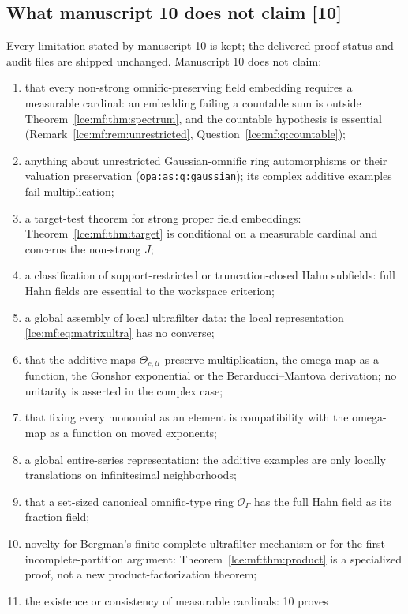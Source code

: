 \documentclass[11pt,letterpaper]{article}
\numberwithin{equation}{section}
\theoremstyle{definition}
\theoremstyle{remark}
\newcommand{\thref}[1]{Theorem~\ref{#1}}
\newcommand{\src}[1]{\textup{\textsf{\small[#1]}}}%
\newcommand{\lbl}[1]{\nolinkurl{#1}}%
\begin{document}
\subsection{What manuscript 10 does not claim \src{10}}
\label{lce:mf:sub:nonclaims}
Every limitation stated by manuscript 10 is kept; the delivered proof-status
and audit files are shipped unchanged. Manuscript 10 does not claim:
\begin{enumerate}[label=10.\arabic*]
\item that every non-strong omnific-preserving field embedding requires a
measurable cardinal: an embedding failing a countable sum is outside
\thref{lce:mf:thm:spectrum}, and the countable hypothesis is essential
(Remark~\ref{lce:mf:rem:unrestricted}, Question~\ref{lce:mf:q:countable});
\item anything about unrestricted Gaussian-omnific ring automorphisms or
their valuation preservation (\lbl{opa:as:q:gaussian}); its complex additive
examples fail multiplication;
\item a target-test theorem for strong proper field embeddings:
\thref{lce:mf:thm:target} is conditional on a measurable cardinal and
concerns the non-strong $J$;
\item a classification of support-restricted or truncation-closed Hahn
subfields: full Hahn fields are essential to the workspace criterion;
\item a global assembly of local ultrafilter data: the local representation
\eqref{lce:mf:eq:matrixultra} has no converse;
\item that the additive maps $\Theta_{c,\mathcal U}$ preserve
multiplication, the omega-map as a function, the Gonshor exponential or the
Berarducci--Mantova derivation; no unitarity is asserted in the complex
case;
\item that fixing every monomial as an element is compatibility with the
omega-map as a function on moved exponents;
\item a global entire-series representation: the additive examples are only
locally translations on infinitesimal neighborhoods;
\item that a set-sized canonical omnific-type ring $\mathcal O_\Gamma$ has
the full Hahn field as its fraction field;
\item novelty for Bergman's finite complete-ultrafilter mechanism or for the
first-incomplete-partition argument: \thref{lce:mf:thm:product} is a
specialized proof, not a new product-factorization theorem;
\item the existence or consistency of measurable cardinals: 10 proves

\end{enumerate}
\end{document}
